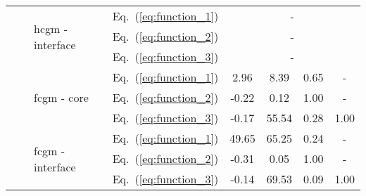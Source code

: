 \begin{table}
\begin{tabular}{ccllcccc}
		\cline{3-8}
		& & \multirow{3}{*}{\ac{hcgm} - interface} & Eq.~(\ref{eq:function_1}) & \multicolumn{4}{c}{-}\\
		& & & Eq.~(\ref{eq:function_2}) & \multicolumn{4}{c}{-}\\
		& & & Eq.~(\ref{eq:function_3}) & \multicolumn{4}{c}{-}\\
		\cline{2-8}
		& \multirow{6}{*}{\rotatebox[origin=c]{90}{100 \unit{\kHz}}} & \multirow{3}{*}{\ac{fcgm} - core} & Eq.~(\ref{eq:function_1}) & 2.96 & 8.39 & 0.65 &-\\
		& & & Eq.~(\ref{eq:function_2}) & -0.22 & 0.12 & 1.00 &- \\
		& & & Eq.~(\ref{eq:function_3}) & -0.17 & 55.54 & 0.28 & 1.00\\
		\cline{3-8}
		& & \multirow{3}{*}{\ac{fcgm} - interface} & Eq.~(\ref{eq:function_1}) & 49.65 & 65.25 & 0.24 &-\\
		& & & Eq.~(\ref{eq:function_2}) & -0.31 & 0.05 & 1.00 &- \\
		& & & Eq.~(\ref{eq:function_3}) & -0.14 & 69.53 & 0.09 & 1.00\\
		\bottomrule
	\end{tabular}
\end{table}


